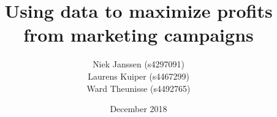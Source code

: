 \documentclass[11pt,]{article}
\date{}
\begin{document}

\setcounter{secnumdepth}{1}

\setlength{\parindent}{0cm}

\setlength{\parskip}{1em}


\let\Begin\begin

\let\End\end

\title{Using data to maximize profits from marketing campaigns}
\author{Niek Janssen (s4297091) \\ Laurens Kuiper (s4467299) \\ Ward Theunisse (s4492765)}
\date{December 2018}

\maketitleru[   course={Bayesian networks},
                righttextheader={We can add some text here:},
                righttext={But only if we want}]
\end{document}
